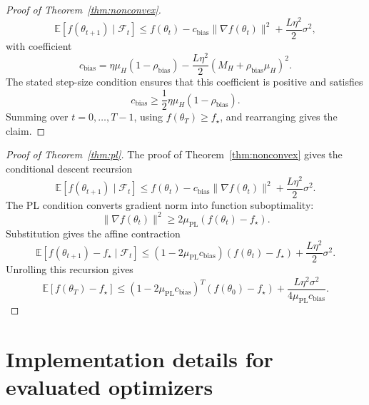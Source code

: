 \documentclass{article}
\newcommand{\E}{\mathbb{E}}
\begin{document}
\begin{proof}[Proof of Theorem~\ref{thm:nonconvex}]
\begin{equation}
    \E[f(\theta_{t+1})\mid\mathcal F_t]
    \le
    f(\theta_t)
    -
    c_{\mathrm{bias}}\|\nabla f(\theta_t)\|^2
    +
    \frac{L\eta^2}{2}\sigma^2,
\end{equation}
with coefficient
\begin{equation}
    c_{\mathrm{bias}}
    =
    \eta\mu_H(1-\rho_{\mathrm{bias}})
    -
    \frac{L\eta^2}{2}(M_H+\rho_{\mathrm{bias}}\mu_H)^2.
\end{equation}
The stated step-size condition ensures that this coefficient is positive and satisfies
\begin{equation}
    c_{\mathrm{bias}}\ge \frac{1}{2}\eta\mu_H(1-\rho_{\mathrm{bias}}).
\end{equation}
Summing over $t=0,\ldots,T-1$, using $f(\theta_T)\ge f_\star$, and rearranging gives the claim.
\end{proof}

\begin{proof}[Proof of Theorem~\ref{thm:pl}]
The proof of Theorem~\ref{thm:nonconvex} gives the conditional descent recursion
\begin{equation}
    \E[f(\theta_{t+1})\mid\mathcal F_t]
    \le
    f(\theta_t)
    -
    c_{\mathrm{bias}}\|\nabla f(\theta_t)\|^2
    +
    \frac{L\eta^2}{2}\sigma^2.
\end{equation}
The PL condition converts gradient norm into function suboptimality:
\begin{equation}
    \|\nabla f(\theta_t)\|^2
    \ge
    2\mu_{\mathrm{PL}}(f(\theta_t)-f_\star).
\end{equation}
Substitution gives the affine contraction
\begin{equation}
    \E[f(\theta_{t+1})-f_\star\mid\mathcal F_t]
    \le
    (1-2\mu_{\mathrm{PL}}c_{\mathrm{bias}})(f(\theta_t)-f_\star)
    +
    \frac{L\eta^2}{2}\sigma^2.
\end{equation}
Unrolling this recursion gives
\begin{equation}
    \E[f(\theta_T)-f_\star]
    \le
    (1-2\mu_{\mathrm{PL}}c_{\mathrm{bias}})^T(f(\theta_0)-f_\star)
    +
    \frac{L\eta^2\sigma^2}{4\mu_{\mathrm{PL}}c_{\mathrm{bias}}}.
\end{equation}
\end{proof}

\section{Implementation details for evaluated optimizers}
\label{app:implementation-details}
\end{document}
